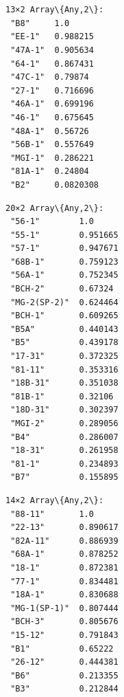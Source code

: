 \documentclass[11pt]{article}
\begin{document}
    \begin{center}
    \end{center}
    { \hspace*{\fill} \\}
    
    \begin{Verbatim}[commandchars=\\\{\}]

    \end{Verbatim}

    \begin{center}
    \end{center}
    { \hspace*{\fill} \\}
    
    \begin{Verbatim}[commandchars=\\\{\}]

    \end{Verbatim}

    
    \begin{Verbatim}[commandchars=\\\{\}]
13×2 Array\{Any,2\}:
 "B8"     1.0
 "EE-1"   0.988215
 "47A-1"  0.905634
 "64-1"   0.867431
 "47C-1"  0.79874
 "27-1"   0.716696
 "46A-1"  0.699196
 "46-1"   0.675645
 "48A-1"  0.56726
 "56B-1"  0.557649
 "MGI-1"  0.286221
 "81A-1"  0.24804
 "B2"     0.0820308
    \end{Verbatim}

    
    
    \begin{Verbatim}[commandchars=\\\{\}]
20×2 Array\{Any,2\}:
 "56-1"        1.0
 "55-1"        0.951665
 "57-1"        0.947671
 "68B-1"       0.759123
 "56A-1"       0.752345
 "BCH-2"       0.67324
 "MG-2(SP-2)"  0.624464
 "BCH-1"       0.609265
 "B5A"         0.440143
 "B5"          0.439178
 "17-31"       0.372325
 "81-11"       0.353316
 "18B-31"      0.351038
 "81B-1"       0.32106
 "18D-31"      0.302397
 "MGI-2"       0.289056
 "B4"          0.286007
 "18-31"       0.261958
 "81-1"        0.234893
 "B7"          0.155895
    \end{Verbatim}

    
    
    \begin{Verbatim}[commandchars=\\\{\}]
14×2 Array\{Any,2\}:
 "88-11"       1.0
 "22-13"       0.890617
 "82A-11"      0.886939
 "68A-1"       0.878252
 "18-1"        0.872381
 "77-1"        0.834481
 "18A-1"       0.830688
 "MG-1(SP-1)"  0.807444
 "BCH-3"       0.805676
 "15-12"       0.791843
 "B1"          0.65222
 "26-12"       0.444381
 "B6"          0.213355
 "B3"          0.212844
    \end{Verbatim}
\end{document}
